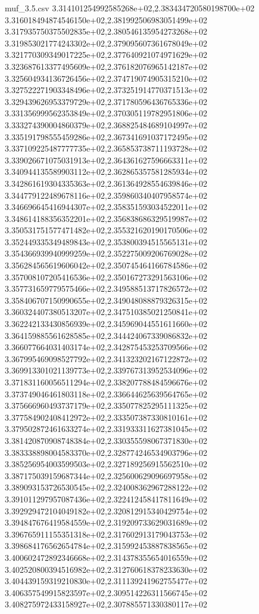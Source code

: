 \begin{filecontents*}{muf_3.5.csv}
3.314101254992585268e+02,2.383434720580198700e+02
3.316018494874546150e+02,2.381992506983051499e+02
3.317935750375502835e+02,2.380546135954273268e+02
3.319853021774243302e+02,2.379095607361678049e+02
3.321770309349017225e+02,2.377640921074971629e+02
3.323687613377495609e+02,2.376182076965142187e+02
3.325604934136726456e+02,2.374719074905315210e+02
3.327522271903348496e+02,2.373251914770371513e+02
3.329439626953379729e+02,2.371780596436765336e+02
3.331356999562353849e+02,2.370305119782951806e+02
3.333274390004860379e+02,2.368825484689104997e+02
3.335191798555459286e+02,2.367341691037172495e+02
3.337109225487777735e+02,2.365853738711193728e+02
3.339026671075031913e+02,2.364361627596663311e+02
3.340944135589903112e+02,2.362865357581285934e+02
3.342861619304335363e+02,2.361364928554639846e+02
3.344779122489678116e+02,2.359860340407958574e+02
3.346696645416944307e+02,2.358351593034522011e+02
3.348614188356352201e+02,2.356838686329519987e+02
3.350531751577471482e+02,2.355321620190170506e+02
3.352449335349489843e+02,2.353800394515565131e+02
3.354366939940999259e+02,2.352275009206769028e+02
3.356284565619606042e+02,2.350745464166784586e+02
3.357008107205416536e+02,2.350167273291563106e+02
3.357731659779575466e+02,2.349588513717826572e+02
3.358406707150990655e+02,2.349048088879326315e+02
3.360324407380513207e+02,2.347510385021250841e+02
3.362242133430856939e+02,2.345969044551611660e+02
3.364159885561628585e+02,2.344424067339086832e+02
3.366077664031403174e+02,2.342875453253709566e+02
3.367995469098527792e+02,2.341323202167122872e+02
3.369913301021139773e+02,2.339767313952534096e+02
3.371831160056511294e+02,2.338207788484596676e+02
3.373749046461803118e+02,2.336644625639564765e+02
3.375666960493737179e+02,2.335077825295111325e+02
3.377584902408412972e+02,2.333507387330810161e+02
3.379502872461633274e+02,2.331933311627381045e+02
3.381420870908748384e+02,2.330355598067371830e+02
3.383338898004583370e+02,2.328774246534903796e+02
3.385256954003599503e+02,2.327189256915562510e+02
3.387175039159687344e+02,2.325600629096697958e+02
3.389093153726530545e+02,2.324008362967288122e+02
3.391011297957087436e+02,2.322412458417811649e+02
3.392929472104049182e+02,2.320812915340429754e+02
3.394847676419584559e+02,2.319209733629031689e+02
3.396765911155351318e+02,2.317602913179043753e+02
3.398684176562654784e+02,2.315992453887838565e+02
3.400602472892346668e+02,2.314378355654016559e+02
3.402520800394516982e+02,2.312760618378233630e+02
3.404439159319210830e+02,2.311139241962755477e+02
3.406357549915823597e+02,2.309514226311566745e+02
3.408275972433158927e+02,2.307885571330380117e+02

\end{filecontents*}
